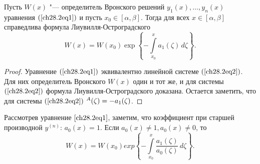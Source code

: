 \begin{thm}
Пусть $W(x)$ "--- определитель Вронского решений $y_1(x), \ldots, y_n(x)$ уравнения $(\ref{ch28.2eq1})$ и пусть $x_0 \in [\alpha, \beta]$. Тогда для всех $x \in [\alpha, \beta]$ справедлива формула Лиувилля-Остроградского
$$
W(x) = W(x_0) \exp \left\lbrace - \int\limits_{x_0}^{x} a_1(\zeta) \,d\zeta \right\rbrace.
$$
\end{thm}

\begin{proof}
Уравнение $(\ref{ch28.2eq1})$ эквивалентно линейной системе $(\ref{ch28.2eq2})$. Для них определитель Вронского $W(x)$ один и тот же, и для системы $(\ref{ch28.2eq2})$ формула Лиувилля-Остроградского доказана. Остается заметить, что для системы $(\ref{ch28.2eq2})$ $\sp A(\zeta) = - a_1(\zeta)$.
\end{proof}

\begin{notion}
Рассмотрев уравнение $\eqref{ch28.2eq1}$, заметим, что коэффициент при старшей производной $y^{(n)}$:  $a_0(x) = 1$. Если $a_0(x) \not= 1, a_0(x) \not= 0$, то 
$$
W(x) = W(x_0) exp \left\lbrace - \int\limits_{x_0}^{x} \frac{a_1(\zeta)}{a_0(\zeta)} \,d\zeta \right\rbrace.
$$
\end{notion}